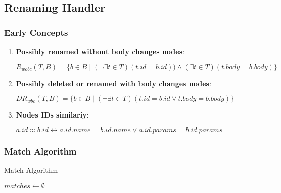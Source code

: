 \documentclass[../../Algorithms.tex]{subfiles}
\begin{document}
    \subsection{Renaming Handler}
    \subsubsection{Early Concepts}

    \begin{enumerate}
        \item \textbf{Possibly renamed without body changes nodes}:

        $R_{wobc}(T, B) = \{ b \in B \mid (\lnot \exists t \in T) (t.id = b.id)) \land (\exists t \in T) (t.body = b.body)\}$

        \item \textbf{Possibly deleted or renamed with body changes nodes}:
        
        $DR_{wbc}(T, B) = \{ b \in B \mid (\lnot \exists t \in T) (t.id = b.id \lor t.body = b.body)\}$

        \item \textbf{Nodes IDs similariy}:
        
        $a.id \approx b.id \leftrightarrow a.id.name = b.id.name \lor a.id.params = b.id.params$
    \end{enumerate}

    \subsubsection{Match Algorithm}
    
    \begin{algorithm}[H]
        \caption{Match Algorithm}
        \SetAlgoLined

        
        \BlankLine
        
        $matches \leftarrow \emptyset$\;

        \BlankLine
    \end{algorithm}
\end{document}
